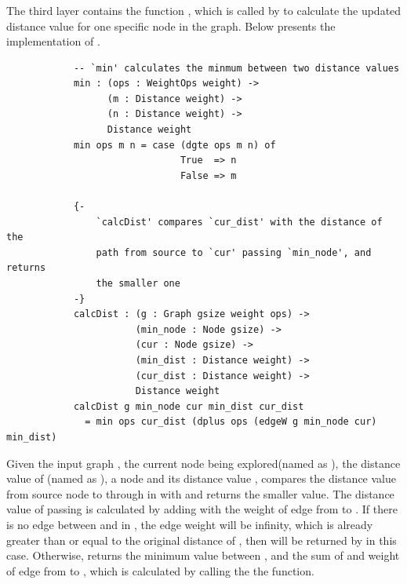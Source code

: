 \subsubsection{} \label{third_layer}
The third layer contains the function , which is called by  to calculate the updated distance value for one specific node in the graph. Below presents the implementation of .
\begin{lstlisting}
			-- `min' calculates the minmum between two distance values
			min : (ops : WeightOps weight) ->
			      (m : Distance weight) ->
			      (n : Distance weight) ->
			      Distance weight
			min ops m n = case (dgte ops m n) of
			                   True  => n
			                   False => m

			{- 
				`calcDist' compares `cur_dist' with the distance of the 
			    path from source to `cur' passing `min_node', and returns
			    the smaller one 
			-}
			calcDist : (g : Graph gsize weight ops) ->
			           (min_node : Node gsize) ->
			           (cur : Node gsize) ->
			           (min_dist : Distance weight) ->
			           (cur_dist : Distance weight) ->
			           Distance weight
			calcDist g min_node cur min_dist cur_dist
			  = min ops cur_dist (dplus ops (edgeW g min_node cur) min_dist)
\end{lstlisting}

Given the input graph , the current node being explored(named as ), the distance value of (named as ), a node  and its distance value ,  compares the distance value from source node to  through  in  with  and returns the smaller value. The distance value of  passing  is calculated by adding  with the weight of edge from  to . If there is no edge between  and  in , the edge weight will be infinity, which is already greater than or equal to the original distance of , then  will be returned by  in this case. Otherwise,  returns the minimum value between , and the sum of  and weight of edge from  to , which is calculated by calling the the  function.
\\
